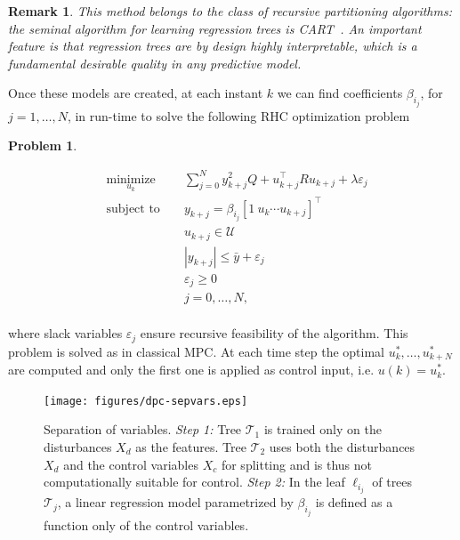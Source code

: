 \documentclass[letterpaper, 10 pt, conference]{ifacconf}  %
\newtheorem{problem}{Problem}
\newtheorem{remark}{Remark}
\begin{document}
\begin{remark}
	This method belongs to the class of recursive partitioning algorithms: the seminal algorithm for learning regression trees is CART~\cite{Breiman1984classification}. An important feature is that regression trees are by design highly interpretable, which is a fundamental desirable quality in any predictive model.
\end{remark}
Once these models are created, at each instant $k$ we can find coefficients $\beta_{i_j}$, for $j=1,\ldots,N$, in run-time to solve the following RHC optimization problem
\begin{problem}\label{pbDPC}

\small
\begin{equation*}
\begin{aligned}
& \underset{u_k}{\text{minimize}} & &  \sum_{j=0}^{N} y_{k+j}^2 Q + u^\top_{k+j} R u_{k+j} +  \lambda\varepsilon_j  \\
& \text{subject to }            & &  y_{k+j}        =   \beta_{i_j} [1\ u_{k} \cdots u_{k+j} ]^\top                   \\
&                               & &  u_{k+j}     \in  \mathcal{U}                                                     \\
&                               & &  |y_{k+j}|     \leq \bar{y} + \varepsilon_j 										\\
&                               & &  \varepsilon_j \geq  0																\\
&                               & &  j              =    0,\ldots,N,            									    \\
\end{aligned}
\end{equation*}
\normalsize
\end{problem}

where slack variables $\varepsilon_j$ ensure recursive feasibility of the algorithm. This problem is solved as in classical MPC. At each time step the optimal $u^*_k,\ldots,u^*_{k+N}$ are computed and only the first one is applied as control input, i.e. $u(k) = u^*_k$.
\begin{figure}[t!]
	\begin{center}
		\texttt{[image: figures/dpc-sepvars.eps]}
		\caption{Separation of variables. \textit{Step 1:} Tree $\mathcal{T}_1$ is trained only on the disturbances $X_d$ as the features. Tree $\mathcal{T}_2$ uses both the disturbances $X_d$ and the control variables $X_c$ for splitting and is thus not computationally suitable for control. \textit{Step 2:} In the leaf $\ell_{i_j}$ of trees $\mathcal{T}_j$, a linear regression model parametrized by $\beta_{i_j}$ is defined as a function only of the control variables.}\label{figSeparationVariables}
	\end{center}
\end{figure}
\end{document}
